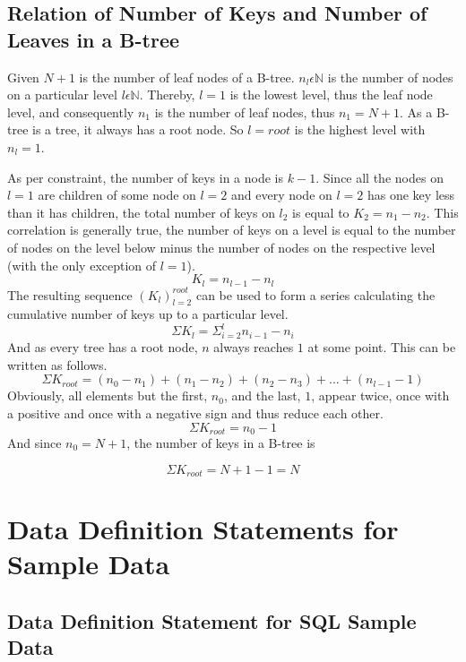 \section{Relation of Number of Keys and Number of Leaves in a B-tree} \label{apx:Relation of Number of Keys and Number of Leaves in a B-tree}
Given $N+1$ is the number of leaf nodes of a B-tree. $n_{l} \epsilon  \mathbb{N}$ is the number of nodes on a particular level $l \epsilon \mathbb{N}$. Thereby, $l = 1$ is the lowest level, thus the leaf node level, and consequently $n_{1}$ is the number of leaf nodes, thus $n_{1} = N+1$. As a B-tree is a tree, it always has a root node. So $l = root$ is the highest level with $n_{l} = 1$.\par %
As per constraint, the number of keys in a node is $k-1$. Since all the nodes on $l = 1$ are children of some node on $l = 2$ and every node on $l = 2$ has one key less than it has children, the total number of keys on $l_{2}$ is equal to $K_{2} = n_{1} - n_{2}$. This correlation is generally true, the number of keys on a level is equal to the number of nodes on the level below minus the number of nodes on the respective level (with the only exception of $l = 1$).
$$ K_{l} = n_{l-1} - n_{l} $$
The resulting sequence $(K_l)_{l=2}^{root}$ can be used to form a series calculating the cumulative number of keys up to a particular level.
$$\Sigma K_l = \Sigma_{i=2}^{l} n_{i-1} - n_{i} $$
And as every tree has a root node, $n$ always reaches $1$ at some point. This can be written as follows.
$$\Sigma K_{root} = (n_0 - n_1) + (n_1 - n_2) + (n_2 - n_3) + ... + (n_{l-1} - 1) $$
Obviously, all elements but the first, $n_0$, and the last, $1$, appear twice, once with a positive and once with a negative sign and thus reduce each other.
$$\Sigma K_{root} = n_0 - 1$$
And since $n_0 = N + 1$, the number of keys in a B-tree is

$$\Sigma K_{root} = N + 1 - 1 = N$$

\chapter{Data Definition Statements for Sample Data}
\section{Data Definition Statement for SQL Sample Data} \label{apx:Data Definition Statement for SQL Sample Data}

